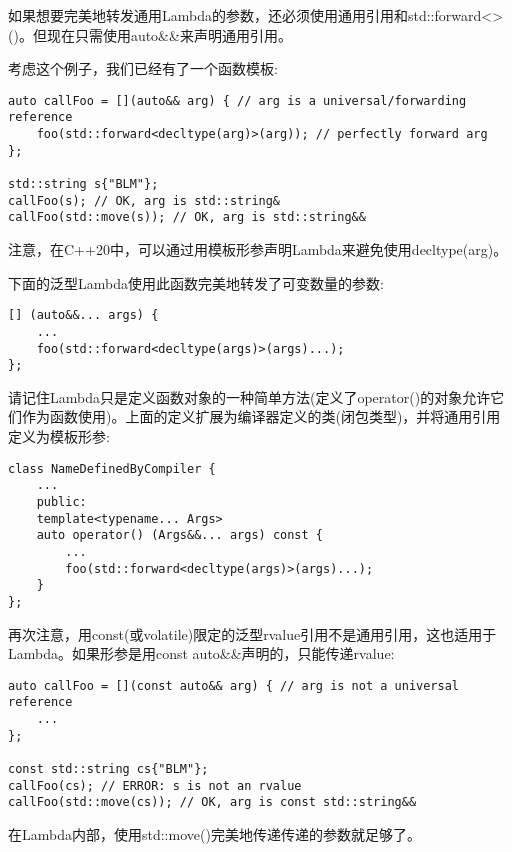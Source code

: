 如果想要完美地转发通用Lambda的参数，还必须使用通用引用和std::forward<>()。但现在只需使用auto\&\&来声明通用引用。\par

考虑这个例子，我们已经有了一个函数模板:\par

\begin{lstlisting}[caption={}]
auto callFoo = [](auto&& arg) { // arg is a universal/forwarding reference
	foo(std::forward<decltype(arg)>(arg)); // perfectly forward arg
};

std::string s{"BLM"};
callFoo(s); // OK, arg is std::string&
callFoo(std::move(s)); // OK, arg is std::string&&
\end{lstlisting}

注意，在C++20中，可以通过用模板形参声明Lambda来避免使用decltype(arg)。\par

下面的泛型Lambda使用此函数完美地转发了可变数量的参数:\par

\begin{lstlisting}[caption={}]
[] (auto&&... args) {
	...
	foo(std::forward<decltype(args)>(args)...);
};
\end{lstlisting}

请记住Lambda只是定义函数对象的一种简单方法(定义了operator()的对象允许它们作为函数使用)。上面的定义扩展为编译器定义的类(闭包类型)，并将通用引用定义为模板形参:\par

\begin{lstlisting}[caption={}]
class NameDefinedByCompiler {
	...
	public:
	template<typename... Args>
	auto operator() (Args&&... args) const {
		...
		foo(std::forward<decltype(args)>(args)...);
	}
};
\end{lstlisting}

再次注意，用const(或volatile)限定的泛型rvalue引用不是通用引用，这也适用于Lambda。如果形参是用const auto\&\&声明的，只能传递rvalue:\par

\begin{lstlisting}[caption={}]
auto callFoo = [](const auto&& arg) { // arg is not a universal reference
	...
};

const std::string cs{"BLM"};
callFoo(cs); // ERROR: s is not an rvalue
callFoo(std::move(cs)); // OK, arg is const std::string&&
\end{lstlisting}

在Lambda内部，使用std::move()完美地传递传递的参数就足够了。\par
















































